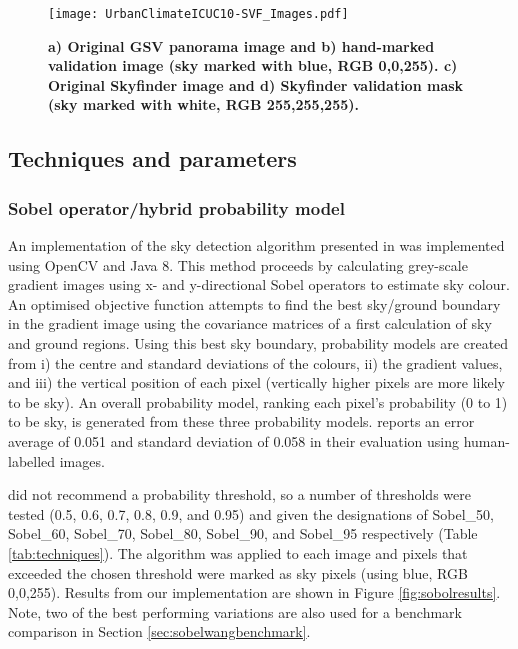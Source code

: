 \documentclass[final,3p,times,authoryear]{elsarticle}
\begin{document}
\begin{figure}
\centering    
\texttt{[image: UrbanClimateICUC10-SVF\_Images.pdf]} 
\caption{\bf a) Original GSV panorama image and b) hand-marked validation image (sky marked with blue, RGB 0,0,255). c) Original Skyfinder image and d) Skyfinder validation mask (sky marked with white, RGB 255,255,255).}    
 \label{fig:origmarked}  
\end{figure} 



\subsection{Techniques and parameters}
\subsubsection{\cite{Wang2015a} Sobel operator/hybrid probability model}\label{sec:prob}
An implementation of the sky detection algorithm presented in \cite{Wang2015a} was implemented using OpenCV and Java 8. This method proceeds by calculating grey-scale gradient images using x- and y-directional Sobel operators to estimate sky colour. An optimised objective function attempts to find the best sky/ground boundary in the gradient image using the covariance matrices of a first calculation of sky and ground regions. Using this best sky boundary, probability models are created from i) the centre and standard deviations of the colours, ii) the gradient values, and iii) the vertical position of each pixel (vertically higher pixels are more likely to be sky). An overall probability model, ranking each pixel's probability (0 to 1) to be sky, is generated from these three probability models. \cite{Wang2015a} reports an error average of 0.051 and standard deviation of 0.058 in their evaluation using human-labelled images.

\cite{Wang2015a} did not recommend a probability threshold, so a number of thresholds were tested (0.5, 0.6, 0.7, 0.8, 0.9, and 0.95) and given the designations of Sobel\_50, Sobel\_60, Sobel\_70, Sobel\_80, Sobel\_90, and Sobel\_95 respectively (Table \ref{tab:techniques}). The algorithm was applied to each image and pixels that exceeded the chosen threshold were marked as sky pixels (using blue, RGB 0,0,255). Results from our implementation are shown in Figure \ref{fig:sobolresults}. Note, two of the best performing variations are also used for a benchmark comparison in Section \ref{sec:sobelwangbenchmark}.
\end{document}

